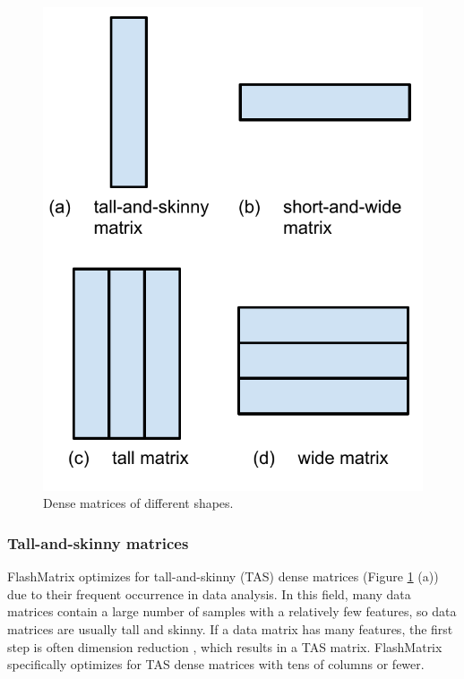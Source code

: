\begin{figure}
	\centering
	\includegraphics[scale=0.5]{FlashMatrix_figs/matrix.pdf}
	\caption{Dense matrices of different shapes.}
	\label{fig:mat}
\end{figure}


\subsubsection{Tall-and-skinny matrices} \label{sec:tas_mat}

FlashMatrix optimizes for tall-and-skinny (TAS) dense matrices (Figure
\ref{fig:mat} (a)) due to their
frequent occurrence in data analysis. In this field, many data matrices contain
a large number of samples with a relatively few features, so
data matrices are usually tall and skinny. If a data matrix has many
features, the first step is often dimension reduction \cite{Jain00}, which
results in a TAS matrix. FlashMatrix specifically optimizes for TAS dense
matrices with tens of columns or fewer.


